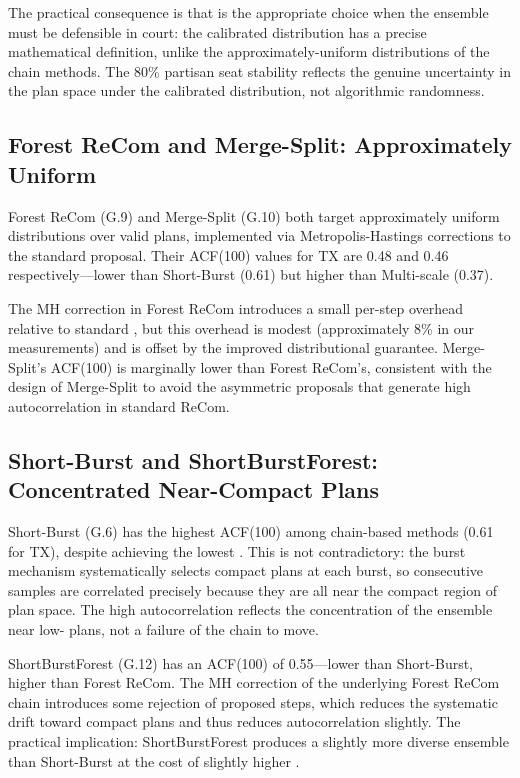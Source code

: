 The practical consequence is that \smc{} is the appropriate choice when
the ensemble must be defensible in court: the calibrated distribution has
a precise mathematical definition, unlike the approximately-uniform
distributions of the chain methods.
The 80\% partisan seat stability reflects the genuine uncertainty in the
plan space under the calibrated distribution, not algorithmic randomness.

\subsection{Forest ReCom and Merge-Split: Approximately Uniform}

Forest ReCom (G.9) and Merge-Split (G.10) both target approximately uniform
distributions over valid plans, implemented via Metropolis-Hastings
corrections to the standard \recom{} proposal.
Their ACF(100) values for TX are 0.48 and 0.46 respectively---lower than
Short-Burst (0.61) but higher than Multi-scale (0.37).

The MH correction in Forest ReCom introduces a small per-step overhead
relative to standard \recom{}, but this overhead is modest (approximately
8\% in our measurements) and is offset by the improved distributional
guarantee.
Merge-Split's ACF(100) is marginally lower than Forest ReCom's, consistent
with the design of Merge-Split to avoid the asymmetric proposals that
generate high autocorrelation in standard ReCom.

\subsection{Short-Burst and ShortBurstForest: Concentrated Near-Compact Plans}

Short-Burst (G.6) has the highest ACF(100) among chain-based methods
(0.61 for TX), despite achieving the lowest \ec{}.
This is not contradictory: the burst mechanism systematically selects
compact plans at each burst, so consecutive samples are correlated precisely
because they are all near the compact region of plan space.
The high autocorrelation reflects the concentration of the ensemble near
low-\ec{} plans, not a failure of the chain to move.

ShortBurstForest (G.12) has an ACF(100) of 0.55---lower than Short-Burst,
higher than Forest ReCom.
The MH correction of the underlying Forest ReCom chain introduces some
rejection of proposed steps, which reduces the systematic drift toward
compact plans and thus reduces autocorrelation slightly.
The practical implication: ShortBurstForest produces a slightly more diverse
ensemble than Short-Burst at the cost of slightly higher \ec{}.

